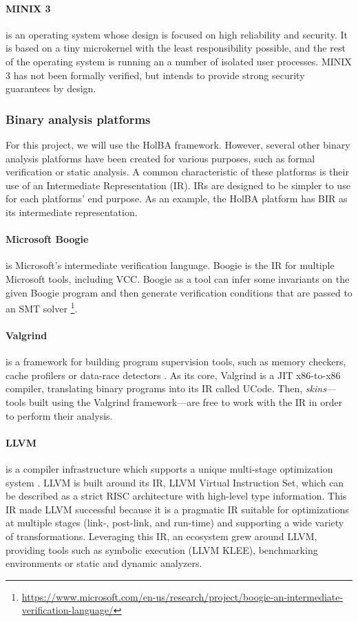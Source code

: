 \documentclass[10pt,a4paper]{article}
\begin{document}
\begin{multicols}{2}
\paragraph{MINIX 3} is an operating system whose design is focused on high reliability and security. It is based on a tiny microkernel with the least responsibility possible, and the rest of the operating system is running an a number of isolated user processes. MINIX 3 has not been formally verified, but intends to provide strong security guarantees by design.

\subsubsection{Binary analysis platforms}

For this project, we will use the {HolBA} framework. However, several other binary analysis platforms have been created for various purposes, such as formal verification or static analysis. A common characteristic of these platforms is their use of an Intermediate Representation ({IR}). IRs are designed to be simpler to use for each platforms' end purpose. As an example, the HolBA platform has BIR as its intermediate representation.

\paragraph{Microsoft Boogie} is Microsoft's intermediate verification language. Boogie is the IR for multiple Microsoft tools, including VCC. Boogie as a tool can infer some invariants on the given Boogie program and then generate verification conditions that are passed to an SMT solver \footnote{\url{https://www.microsoft.com/en-us/research/project/boogie-an-intermediate-verification-language/}}.

\paragraph{Valgrind} is a framework for building program supervision tools, such as memory checkers, cache profilers or data-race detectors \cite{nethercote_valgrind:_2003}. As its core, Valgrind is a JIT x86-to-x86 compiler, translating binary programs into its IR called UCode. Then, \textit{skins}---tools built using the Valgrind framework---are free to work with the IR in order to perform their analysis.

\paragraph{LLVM} is a compiler infrastructure which supports a unique multi-stage optimization system \cite{lattner_llvm:_2002}. LLVM is built around its {IR}, LLVM Virtual Instruction Set, which can be described as a strict RISC architecture with high-level type information. This IR made LLVM successful because it is a pragmatic IR suitable for optimizations at multiple stages (link-, post-link, and run-time) and supporting a wide variety of transformations. Leveraging this IR, an ecosystem grew around LLVM, providing tools such as symbolic execution (LLVM KLEE), benchmarking environments or static and dynamic analyzers.


\end{multicols}
\end{document}
